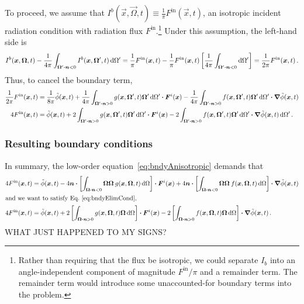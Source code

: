 To proceed, we assume that $I^b( \vec{x}, \vec{\Omega}, t)
\equiv \frac{1}{\pi} F^\mathrm{in}( \vec{x}, t)$, an isotropic incident
radiation condition with radiation flux $F^\mathrm{in}$.\footnote{Rather than
requiring that the flux be isotropic, we could separate $I_b$ into an
angle-independent component of magnitude $F^\mathrm{in}/\pi$ and a remainder
term. The remainder term would introduce some unaccounted-for boundary terms
into the problem.} Under this assumption, the left-hand side is
\begin{equation*}
I^b( \bm{x},\bm{\Omega},  t)
- \frac{1}{4\pi} \int_{\bm{\Omega}' \bm{\cdot} \bm{n} < 0}
I^b( \bm{x}, \bm{\Omega}', t) \mathop{}\!\mathrm{d} \Omega'
= \frac{1}{\pi} F^\mathrm{in}( \bm{x}, t)
- \frac{1}{\pi} F^\mathrm{in}( \bm{x}, t) \left[ \frac{1}{4\pi}
\int_{\bm{\Omega}' \bm{\cdot} \bm{n} < 0} \mathop{}\!\mathrm{d} \Omega'\right]
= \frac{1}{2\pi} F^\mathrm{in}( \bm{x}, t)\,.
\end{equation*}
Thus, to cancel the boundary term,
\begin{align}\nonumber
  \frac{1}{2\pi} F^\mathrm{in}( \bm{x}, t)
  &=
  \frac{1}{8\pi} \tilde \phi(\bm{x}, t)
+ \frac{1}{4\pi} \int_{\bm{\Omega}' \bm{\cdot} \bm{n} > 0} 
 g(\bm{x}, \bm{\Omega}', t) \bm{\Omega}' \mathop{}\!\mathrm{d} \Omega'
 \bm{\cdot} \bm{F}^i(\bm{x})
- \frac{1}{4\pi} \int_{\bm{\Omega}' \bm{\cdot} \bm{n} > 0} 
 f(\bm{x}, \bm{\Omega}', t) \bm{\Omega}' \mathop{}\!\mathrm{d} \Omega'
 \bm{\cdot} \bm{\nabla} \tilde\phi(\bm{x},t)
 \\ \label{eq:bndyElimCond}
 4 F^\mathrm{in}( \bm{x}, t)
  &=
  \tilde \phi(\bm{x}, t)
+ 2\int_{\bm{\Omega}' \bm{\cdot} \bm{n} > 0} 
 g(\bm{x}, \bm{\Omega}', t) \bm{\Omega}' \mathop{}\!\mathrm{d} \Omega'
 \bm{\cdot} \bm{F}^i(\bm{x})
- 2\int_{\bm{\Omega}' \bm{\cdot} \bm{n} > 0} 
 f(\bm{x}, \bm{\Omega}', t) \bm{\Omega}' \mathop{}\!\mathrm{d} \Omega'
 \bm{\cdot} \bm{\nabla} \tilde\phi(\bm{x},t)
 \mathop{}\!\mathrm{d} \Omega'\,.
\end{align}

\subsubsection{Resulting boundary conditions}

In summary, the low-order equation~\eqref{eq:bndyAnisotropic} demands that
\begin{align*}
 4F^\mathrm{in}(\bm{x}, t)
 &=
 \tilde \phi(\bm{x}, t) 
 - 4 \bm{n} \bm{\cdot} \left[ \int_{\bm{\Omega} \bm{\cdot} \bm{n} < 0}
 \bm{\Omega} \bm{\Omega}\:
 g(\bm{x}, \bm{\Omega}, t) \mathop{}\!\mathrm{d}\Omega \right] \bm{\cdot} \bm{F}^i(\bm{x})
 + 4 \bm{n} \bm{\cdot} \left[ \int_{\bm{\Omega} \bm{\cdot} \bm{n} < 0}
 \bm{\Omega} \bm{\Omega}\:
 f(\bm{x}, \bm{\Omega}, t) \mathop{}\!\mathrm{d}\Omega \right] \bm{\cdot} \bm{\nabla} \tilde\phi(\bm{x}, t)
\\ 
\intertext{and we want to satisfy Eq.~\eqref{eq:bndyElimCond},}
 4 F^\mathrm{in}( \bm{x}, t)
  &=
  \tilde \phi(\bm{x}, t)
+ 2 \left[ \int_{\bm{\Omega} \bm{\cdot} \bm{n} > 0} 
 g(\bm{x}, \bm{\Omega}, t) \bm{\Omega} \mathop{}\!\mathrm{d} \Omega \right]
 \bm{\cdot} \bm{F}^i(\bm{x})
- 2\left[\int_{\bm{\Omega} \bm{\cdot} \bm{n} > 0} 
 f(\bm{x}, \bm{\Omega}, t) \bm{\Omega} \mathop{}\!\mathrm{d} \Omega \right]
\bm{\cdot} \bm{\nabla} \tilde\phi(\bm{x},t)
 \,.
\end{align*}
WHAT JUST HAPPENED TO MY SIGNS?

